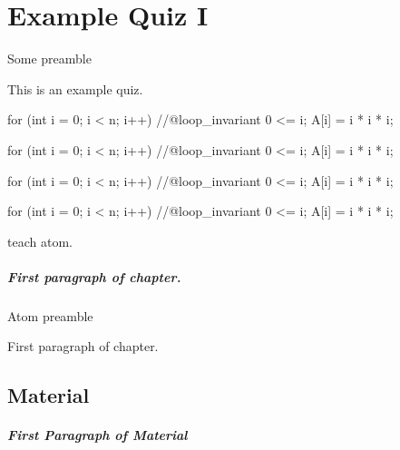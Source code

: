 \chapter[100]{Example Quiz I}
\label{ch:quiz-ii}

  Some preamble \somecommand

\begin{preamble}
  This is an example quiz.
\end{preamble}


\begin{code}
  for (int i = 0; i < n; i++)  
  //@loop_invariant 0 <= i;  
  {  
    A[i] = i * i * i;  
  }  
\end{code}

\begin{code}[language=cnot, numbers=none, firstline = 100, lastline = 1001]
  for (int i = 0; i < n; i++)  
  //@loop_invariant 0 <= i;  
  {  
    A[i] = i * i * i;  
  }  
\end{code}

\begin{code}[language=cnot, numbers=left, firstline = 100, lastline = 1002]
  for (int i = 0; i < n; i++)  
  //@loop_invariant 0 <= i;  
  {  
    A[i] = i * i * i;  
  }  
\end{code}


\begin{code}[title = some cnut code, numbers = left, language=cnot, firstline = 100, lastline = 1003]
  for (int i = 0; i < n; i++)  
  //@loop_invariant 0 <= i;  
  {  
    A[i] = i * i * i;  
  }  
\end{code}

\begin{teachask}
teach atom.
\end{teachask}

\paragraph{First paragraph of chapter.}

Atom preamble

\begin{gram}
First paragraph of chapter.
\end{gram}



\section{Material}

\paragraph{First Paragraph of Material}

